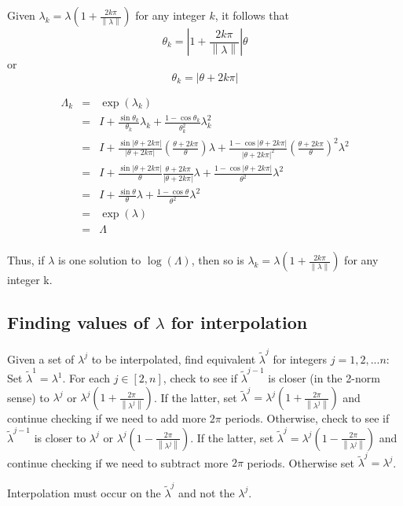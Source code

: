 \documentclass[10pt,letterpaper,oneside,notitlepage]{article}
\begin{document}
Given $\lambda_k = \lambda \left( 1 + \frac{2k\pi}{\left\| \lambda \right\|}\right)$ for any integer $k$, it follows that 
\begin{equation}
\theta_k = \left| 1 + \frac{2k\pi}{\left\|\lambda\right\|}\right| \theta
\end{equation}
or
\begin{equation}
\theta_k =  \left|\theta + 2k\pi\right|
\end{equation}

\begin{eqnarray*}
\Lambda_k
&=&  \exp(\lambda_k) \\
&=&  I + \frac{\sin\theta_k}{\theta_k}\lambda_k + \frac{1-\cos\theta_k}{\theta_k^2}\lambda_k^2  \\
&=&  I + \frac{\sin\left|\theta + 2k\pi\right|}{\left|\theta + 2k\pi\right|}\left( \frac{\theta+2k\pi}{\theta}\right)\lambda + \frac{1-\cos\left|\theta + 2k\pi\right|}{\left|\theta + 2k\pi\right|^2}\left(\frac{\theta+2k\pi}{\theta}\right)^2\lambda^2  \\
&=&  I + \frac{\sin\left|\theta + 2k\pi\right|}{\theta} 
         \frac{\theta + 2k\pi}{\left|\theta + 2k\pi\right|}\lambda + \frac{1-\cos\left|\theta + 2k\pi\right|}{\theta^2}\lambda^2\\
&=&  I + \frac{\sin\theta}{\theta} \lambda + \frac{1-\cos\theta}{\theta^2}\lambda^2\\
&=& \exp(\lambda) \\
&=& \Lambda \\
\end{eqnarray*}

Thus, if $\lambda$ is one solution to $\log(\Lambda)$, then so is 
$\lambda_k = \lambda \left( 1 + \frac{2k\pi}{\left\| \lambda \right\|}\right)$ for any integer k.

\subsection{Finding values of $\lambda$ for interpolation} 
Given a set of $\lambda^j$ to be interpolated, find equivalent $\tilde{\lambda}^j$ for integers $j=1,2,...n$:
Set $\tilde{\lambda}^1 = \lambda^1$.
For each $j\in\left[2,n\right]$, 
check to see if $\tilde{\lambda}^{j-1}$ is closer (in the 2-norm sense) to 
$\lambda^j$ or $\lambda^j \left( 1 + \frac{2\pi}{\left\| \lambda^j \right\|}\right)$. 
If the latter, set $\tilde{\lambda}^{j}=\lambda^j \left( 1 + \frac{2\pi}{\left\| \lambda^j \right\|}\right)$ and continue checking if we need to add more $2\pi$ periods.
Otherwise, check to see if $\tilde{\lambda}^{j-1}$ is closer to 
$\lambda^j$ or $\lambda^j \left( 1 - \frac{2\pi}{\left\| \lambda^j \right\|}\right)$. 
If the latter, set $\tilde{\lambda}^{j}=\lambda^j \left( 1 - \frac{2\pi}{\left\| \lambda^j \right\|}\right)$ and continue checking if we need to subtract more $2\pi$ periods.
Otherwise set $\tilde{\lambda}^{j} = \lambda^j$.


Interpolation must occur on the $\tilde{\lambda}^{j}$ and not the $\lambda^j$.
\end{document}
